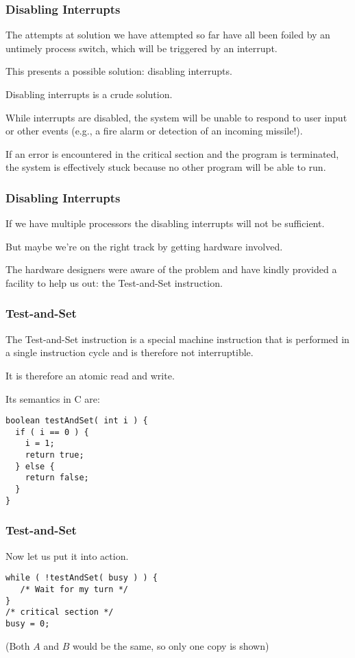 \begin{frame}
\frametitle{Disabling Interrupts}

The attempts at solution we have attempted so far have all been foiled by an untimely process switch, which will be triggered by an interrupt. 

This presents a possible solution: disabling interrupts. 

Disabling interrupts is a crude solution. 

While interrupts are disabled, the system will be unable to respond to user input or other events (e.g., a fire alarm or detection of an incoming missile!). 

If an error is encountered in the critical section and the program is terminated, the system is effectively stuck because no other program will be able to run.


\end{frame}

\begin{frame}
\frametitle{Disabling Interrupts}

If we have multiple processors the disabling interrupts will not be sufficient. 

But maybe we're on the right track by getting hardware involved.


The hardware designers were aware of the problem and have kindly provided a facility to help us out: the \alert{Test-and-Set} instruction. 


\end{frame}

\begin{frame}[fragile]
\frametitle{Test-and-Set}

The Test-and-Set instruction is a special machine instruction that is performed in a single instruction cycle and is therefore not interruptible. 

It is therefore an atomic read and write. 

Its semantics in C are:

\begin{verbatim}
boolean testAndSet( int i ) {
  if ( i == 0 ) {
    i = 1;
    return true;
  } else {
    return false;
  }
}
\end{verbatim}

\end{frame}

\begin{frame}[fragile]
\frametitle{Test-and-Set}

Now let us put it into action.

\begin{verbatim}
while ( !testAndSet( busy ) ) {
   /* Wait for my turn */
}
/* critical section */
busy = 0;
\end{verbatim}


(Both $A$ and $B$ would be the same, so only one copy is shown)


\end{frame}

